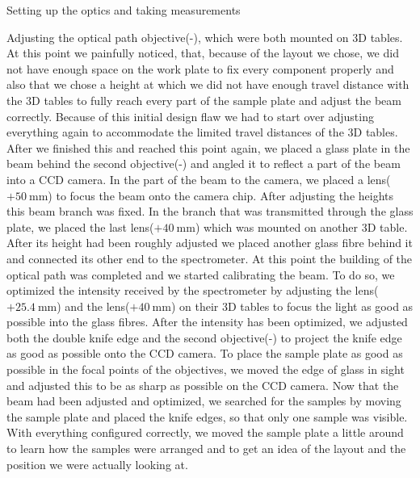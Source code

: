 \documentclass[pdftex, a4paper,11pt, twoside, UKenglish]{report}
\begin{document}
\begin{chapter}{Setting up the optics and taking measurements}
\begin{section}{Adjusting the optical path}
      objective(-), which were both mounted on 3D tables. At this point we
      painfully noticed, that, because of the layout we chose, we did not have
      enough space on the work plate to fix every component properly and also
      that we chose a height at which we did not have enough travel distance
      with the 3D tables to fully reach every part of the sample plate and
      adjust the beam correctly. Because of this initial design flaw we had to
      start over adjusting everything again to accommodate the limited
      travel distances of the 3D tables. \newline
      After we finished this and reached this point again, we placed a glass
      plate in the beam behind the second objective(-) and angled it to
      reflect a part of the beam into a CCD camera. In the part of the beam
      to the camera, we placed a lens($+\SI{50}{\milli\meter}$) to focus the
      beam onto the camera chip. After adjusting the heights this beam branch
      was fixed.\newline
      In the branch that was transmitted through the glass plate, we
      placed the last lens($+\SI{40}{\milli\meter}$) which was mounted on
      another 3D table. After its height had been roughly adjusted we placed
      another glass fibre behind it and connected its other end to the
      spectrometer. \newline
      At this point the building of the optical path was completed
      and we started calibrating the beam. To do so, we optimized the intensity
      received by the spectrometer by adjusting the
      lens($+\SI{25.4}{\milli\meter}$) and the lens($+\SI{40}{\milli\meter}$)
      on their 3D tables to focus the light as good as possible into the glass
      fibres. After the intensity has been optimized, we adjusted both the
      double knife edge and the second objective(-) to project the knife edge
      as good as possible onto the CCD camera. To place the sample plate as good
      as possible in the focal points of the objectives, we moved the edge of
      glass in sight and adjusted this to be as sharp as possible on the CCD
      camera. \newline
      Now that the beam had been adjusted and optimized, we searched for the
      samples by moving the sample plate and placed the knife edges, so that
      only one sample was visible. \newline
      With everything configured correctly, we moved the sample plate a little
      around to learn how the samples were arranged and to get an idea of the
      layout and the position we were actually looking at.
      \vfill
    \end{section}
    

\end{chapter}
\end{document}
